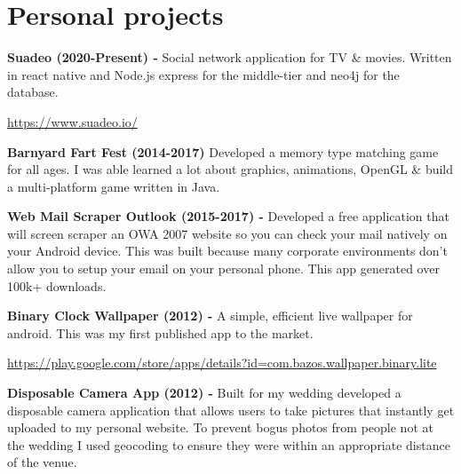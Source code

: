 \documentclass[a4paper,online]{adcv}
\begin{document}
\section{Personal projects}

\begin{adcvtabletwo}
  \textbf{Suadeo (2020-Present) - }
  Social network application for TV \& movies. Written in react native and Node.js express for the middle-tier and neo4j for the database.
  
  \href{https://www.suadeo.io/}{https://www.suadeo.io/} 
  
  \adcvrowskip
  
  \textbf{Barnyard Fart Fest (2014-2017) }
  Developed a memory type matching game for all ages. I was able learned a lot about graphics, animations, OpenGL \& build a multi-platform game written in Java.
  
  \adcvrowskip
  
  \textbf{Web Mail Scraper Outlook (2015-2017) - }
  Developed a free application that will screen scraper an OWA 2007 website so you can check your mail natively on your Android device. This was built because many corporate environments don’t allow you to setup your email on your personal phone. This app generated over 100k+ downloads.
  
  \adcvrowskip
  
  \textbf{Binary Clock Wallpaper (2012) - }
  A simple, efficient live wallpaper for android. This was my first published app to the market.
  
  \href{https://play.google.com/store/apps/details?id=com.bazos.wallpaper.binary.lite}{https://play.google.com/store/apps/details?id=com.bazos.wallpaper.binary.lite} 
  
  
  \adcvrowskip

  \textbf{Disposable Camera App (2012) - }
  Built for my wedding developed a disposable camera application that allows users to take pictures that instantly get uploaded to my personal website. To prevent bogus photos from people not at the wedding I used geocoding to ensure they were within an appropriate distance of the venue.
\end{adcvtabletwo}
\end{document}
